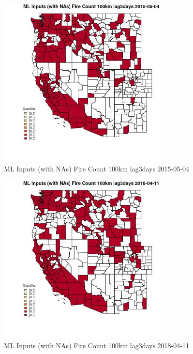 \begin{figure} 
\centering  
\includegraphics[width=0.77\textwidth]{Code_Outputs/Report_ML_input_PM25_Step4_part_e_de_duplicated_aves_compiled_2019-05-18wNAs_CountyFire_Count_100km_lag3daysMean2015-05-04_2015-05-04.jpg} 
\caption{\label{fig:Report_ML_input_PM25_Step4_part_e_de_duplicated_aves_compiled_2019-05-18wNAsCountyFire_Count_100km_lag3daysMean2015-05-04_2015-05-04}ML Inputs (with NAs) Fire Count 100km lag3days 2015-05-04} 
\end{figure} 
 

\begin{figure} 
\centering  
\includegraphics[width=0.77\textwidth]{Code_Outputs/Report_ML_input_PM25_Step4_part_e_de_duplicated_aves_compiled_2019-05-18wNAs_CountyFire_Count_100km_lag3daysMean2018-04-11_2018-04-11.jpg} 
\caption{\label{fig:Report_ML_input_PM25_Step4_part_e_de_duplicated_aves_compiled_2019-05-18wNAsCountyFire_Count_100km_lag3daysMean2018-04-11_2018-04-11}ML Inputs (with NAs) Fire Count 100km lag3days 2018-04-11} 
\end{figure} 
 

